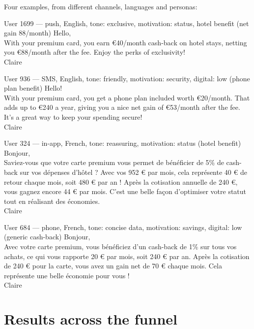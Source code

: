 \documentclass[11pt,a4paper]{article}
\newcommand{\eur}{\texttt{\texteuro}}
\begin{document}
Four examples, from different channels, languages and personas:

\begin{msg}[ck]{User 1699 --- push, English, tone: exclusive, motivation: status, hotel benefit (net gain \eur 88/month)}
Hello,\\
With your premium card, you earn €40/month cash-back on hotel stays, netting you €88/month after the fee. Enjoy the perks of exclusivity!\\
Claire
\end{msg}

\begin{msg}[ck]{User 936 --- SMS, English, tone: friendly, motivation: security, digital: low (phone plan benefit)}
Hello!\\
With your premium card, you get a phone plan included worth €20/month. That adds up to €240 a year, giving you a nice net gain of €53/month after the fee. It's a great way to keep your spending secure!\\
Claire
\end{msg}

\begin{msg}[ck]{User 324 --- in-app, French, tone: reassuring, motivation: status (hotel benefit)}
Bonjour,\\
Saviez-vous que votre carte premium vous permet de bénéficier de 5\% de cash-back sur vos dépenses d'hôtel ? Avec vos 952 € par mois, cela représente 40 € de retour chaque mois, soit 480 € par an ! Après la cotisation annuelle de 240 €, vous gagnez encore 44 € par mois. C'est une belle façon d'optimiser votre statut tout en réalisant des économies.\\
Claire
\end{msg}

\begin{msg}[ck]{User 684 --- phone, French, tone: concise data, motivation: savings, digital: low (generic cash-back)}
Bonjour,\\
Avec votre carte premium, vous bénéficiez d'un cash-back de 1\% sur tous vos achats, ce qui vous rapporte 20 € par mois, soit 240 € par an. Après la cotisation de 240 € pour la carte, vous avez un gain net de 70 € chaque mois. Cela représente une belle économie pour vous !\\
Claire
\end{msg}

\section{Results across the funnel}
\end{document}
